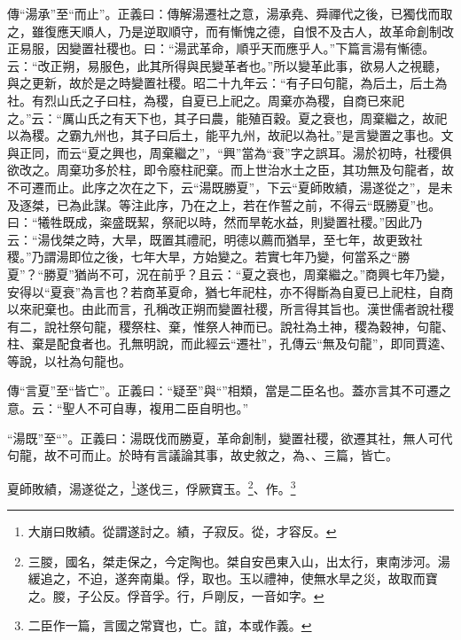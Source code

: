 {\noindent\zhuan{}\fzbyks 傳“湯承”至“而止”。正義曰：傳解湯遷社之意，湯承堯、舜禪代之後，已獨伐而取之，雖復應天順人，乃是逆取順守，而有慚愧之德，自恨不及古人，故革命創制改正易服，因變置社稷也。曰：“湯武革命，順乎天而應乎人。”下篇言湯有慚德。云：“改正朔，易服色，此其所得與民變革者也。”所以變革此事，欲易人之視聽，與之更新，故於是之時變置社稷。昭二十九年云：“有子曰句龍，為后土，后土為社。有烈山氏之子曰柱，為稷，自夏已上祀之。周棄亦為稷，自商已來祀之。”云：“厲山氏之有天下也，其子曰農，能殖百穀。夏之衰也，周棄繼之，故祀以為稷。之霸九州也，其子曰后土，能平九州，故祀以為社。”是言變置之事也。文與正同，而云“夏之興也，周棄繼之”，“興”當為“衰”字之誤耳。湯於初時，社稷俱欲改之。周棄功多於柱，即令廢柱祀棄。而上世治水土之臣，其功無及句龍者，故不可遷而止。此序之次在之下，云“湯既勝夏”，下云“夏師敗績，湯遂從之”，是未及逐桀，已為此謀。等注此序，乃在之上，若在作誓之前，不得云“既勝夏”也。曰：“犧牲既成，粢盛既絜，祭祀以時，然而旱乾水益，則變置社稷。”因此乃云：“湯伐桀之時，大旱，既置其禮祀，明德以薦而猶旱，至七年，故更致社稷。”乃謂湯即位之後，七年大旱，方始變之。若實七年乃變，何當系之“勝夏”？“勝夏”猶尚不可，況在前乎？且云：“夏之衰也，周棄繼之。”商興七年乃變，安得以“夏衰”為言也？若商革夏命，猶七年祀柱，亦不得斷為自夏已上祀柱，自商以來祀棄也。由此而言，孔稱改正朔而變置社稷，所言得其旨也。漢世儒者說社稷有二，說社祭句龍，稷祭柱、棄，惟祭人神而已。說社為土神，稷為穀神，句龍、柱、棄是配食者也。孔無明說，而此經云“遷社”，孔傳云“無及句龍”，即同賈逵、等說，以社為句龍也。 \par}

{\noindent\zhuan{}\fzbyks 傳“言夏”至“皆亡”。正義曰：“疑至”與“”相類，當是二臣名也。蓋亦言其不可遷之意。云：“聖人不可自專，複用二臣自明也。” \par}

{\noindent\shu{}\fzkt “湯既”至“”。正義曰：湯既伐而勝夏，革命創制，變置社稷，欲遷其社，無人可代句龍，故不可而止。於時有言議論其事，故史敘之，為、、三篇，皆亡。 \par}

夏師敗績，湯遂從之，\footnote{大崩曰敗績。從謂遂討之。績，子寂反。從，才容反。}遂伐三，俘厥寶玉。\footnote{三朡，國名，桀走保之，今定陶也。桀自安邑東入山，出太行，東南涉河。湯緩追之，不迫，遂奔南巢。俘，取也。玉以禮神，使無水旱之災，故取而寶之。朡，子公反。俘音孚。行，戶剛反，一音如字。}、作。\footnote{二臣作一篇，言國之常寶也，亡。誼，本或作義。}

